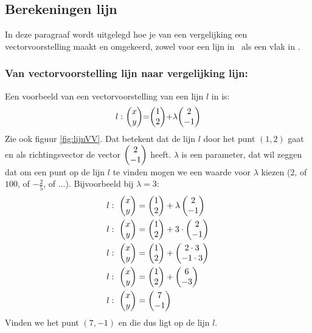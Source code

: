 
\subsection{Berekeningen lijn}
In deze paragraaf wordt uitgelegd hoe je van een vergelijking een vectorvoorstelling maakt en omgekeerd, zowel voor een lijn in \RT \ als een vlak in \RD. 

\subsubsection{Van vectorvoorstelling lijn naar vergelijking lijn:} 
Een voorbeeld van een  vectorvoorstelling van een lijn $l$ in \RT is: \[l:\ \vectwee{x}{y} = \vectwee{1}{2} + \lambda \vectwee{2}{-1} \] 
Zie ook figuur \ref{fig:lijnVV}. Dat betekent dat de lijn $l$ door het punt $(1,2)$ gaat en als richtingsvector de vector $ \vectwee {2}{-1} $ heeft. $\lambda$ is een parameter, dat wil zeggen dat om een punt op de lijn $l$ te vinden mogen we een waarde voor $\lambda $ kiezen ($2$, of $100$, of $-\frac{2}{5}$, of ...). Bijvoorbeeld bij  $\lambda=3$: 
\begin{align*}
  l: \ \begin{pmatrix} x \\ y \end{pmatrix} &= \begin{pmatrix} 1 \\ 2 \end{pmatrix}  + \lambda  \begin{pmatrix} 2 \\ -1 \end{pmatrix}  \\
  l: \ \begin{pmatrix} x \\ y \end{pmatrix} &= \begin{pmatrix} 1 \\ 2 \end{pmatrix}  + 3 \cdot \begin{pmatrix} 2 \\ -1 \end{pmatrix}  \\
  l: \ \begin{pmatrix} x \\ y \end{pmatrix} &= \begin{pmatrix} 1 \\ 2 \end{pmatrix}  + \begin{pmatrix} 2\cdot 3 \\ -1\cdot 3 \end{pmatrix}  \\
  l: \ \begin{pmatrix} x \\ y \end{pmatrix} &= \begin{pmatrix} 1 \\ 2 \end{pmatrix}  + \begin{pmatrix} 6 \\ -3 \end{pmatrix}  \\
  l: \ \begin{pmatrix} x \\ y \end{pmatrix} &= \begin{pmatrix} 7 \\ -1 \end{pmatrix}
\end{align*}
Vinden we het punt $(7,-1)$ en die dus ligt op de lijn $l$.

